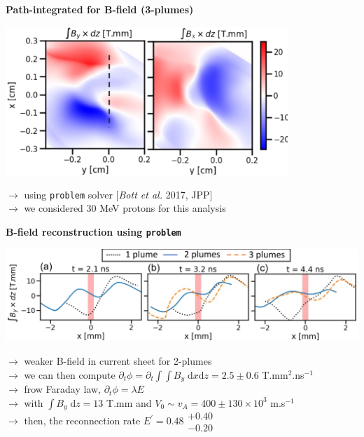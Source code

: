 \documentclass[landscape]{slides}
\newcommand{\D}{{\mathrm d}}
\begin{document}
\begin{slide}
{\large \textbf{Path-integrated for B-field (3-plumes)}}

\begin{center}
\includegraphics[width=0.8\textwidth]{B_integrated.png}
\end{center}

$\to$ using \texttt{problem} solver [\textit{Bott et al.} 2017, JPP] \\
$\to$ we considered 30 MeV protons for this analysis \\

\end{slide}




\begin{slide}
{\large \textbf{B-field reconstruction using \texttt{problem}}}

\begin{center}
\includegraphics[width=1.0\textwidth]{problem.png}
\end{center}

$\to$ weaker B-field in current sheet for 2-plumes \\
$\to$ we can then compute $\partial_t \phi = \partial_t \int \!\!\! \int B_y \; \D x \D z = 2.5 \pm 0.6$ T.mm$^2$.ns$^{-1}$ \\
$\to$ frow Faraday law, $\partial_t \phi = \lambda E$ \\
$\to$ with $\int B_y \; \D z = 13$ T.mm and $V_0 \sim v_A = 400 \pm 130 \times 10^3$ m.s$^{-1}$ \\
    $\to$ then, the reconnection rate $E^{\prime} = 0.48 \substack{+0.40 \\ -0.20}$ \\

\end{slide}
\end{document}

